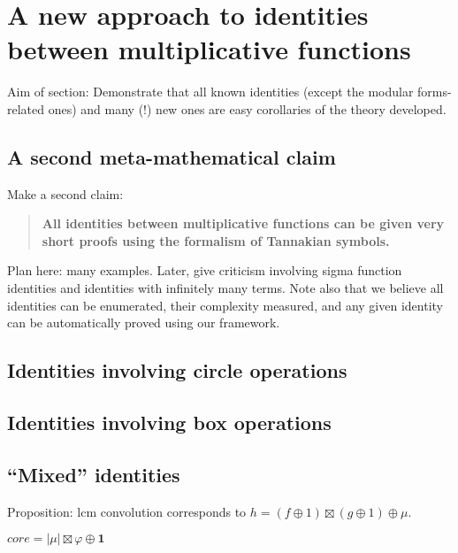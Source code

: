 
\section{A new approach to identities between multiplicative functions}

Aim of section: Demonstrate that all known identities (except the modular forms-related ones) and many (!) new ones are easy corollaries of the theory developed. 


\subsection{A second meta-mathematical claim}

Make a second claim:
\begin{quote}
\textbf{All identities between multiplicative functions can be given very short proofs using the formalism of Tannakian symbols.}
\end{quote}

Plan here: many examples. Later, give criticism involving sigma function identities and identities with infinitely many terms. Note also that we believe all identities can be enumerated, their complexity measured, and any given identity can be automatically proved using our framework.



\subsection{Identities involving circle operations}


\subsection{Identities involving box operations}




\subsection{``Mixed'' identities}

Proposition: lcm convolution corresponds to $h = (f \oplus 1) \boxtimes (g \oplus 1) \oplus \mu $.





\begin{example}
$core = \vert \mu \vert \boxtimes \varphi \oplus \mathbf{1}$ 
\end{example}

